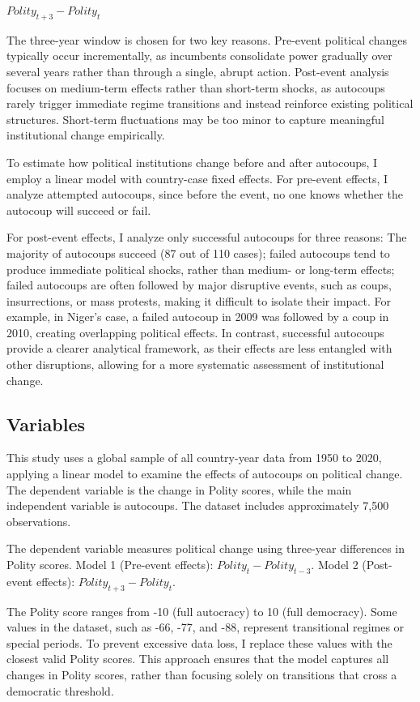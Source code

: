\documentclass[
  12pt,
]{report}
\begin{document}
\(Polity_{t+3} - Polity_t\)

The three-year window is chosen for two key reasons. Pre-event political
changes typically occur incrementally, as incumbents consolidate power
gradually over several years rather than through a single, abrupt
action. Post-event analysis focuses on medium-term effects rather than
short-term shocks, as autocoups rarely trigger immediate regime
transitions and instead reinforce existing political structures.
Short-term fluctuations may be too minor to capture meaningful
institutional change empirically.

To estimate how political institutions change before and after
autocoups, I employ a linear model with country-case fixed effects. For
pre-event effects, I analyze attempted autocoups, since before the
event, no one knows whether the autocoup will succeed or fail.

For post-event effects, I analyze only successful autocoups for three
reasons: The majority of autocoups succeed (87 out of 110 cases); failed
autocoups tend to produce immediate political shocks, rather than
medium- or long-term effects; failed autocoups are often followed by
major disruptive events, such as coups, insurrections, or mass protests,
making it difficult to isolate their impact. For example, in Niger's
case, a failed autocoup in 2009 was followed by a coup in 2010, creating
overlapping political effects. In contrast, successful autocoups provide
a clearer analytical framework, as their effects are less entangled with
other disruptions, allowing for a more systematic assessment of
institutional change.

\subsection{Variables}\label{variables}

This study uses a global sample of all country-year data from 1950 to
2020, applying a linear model to examine the effects of autocoups on
political change. The dependent variable is the change in Polity scores,
while the main independent variable is autocoups. The dataset includes
approximately 7,500 observations.

The dependent variable measures political change using three-year
differences in Polity scores. Model 1 (Pre-event effects):
\(Polity_t − Polity_{t − 3}\). Model 2 (Post-event effects):
\(Polity_{t+3} - Polity_t\).

The Polity score ranges from -10 (full autocracy) to 10 (full
democracy). Some values in the dataset, such as -66, -77, and -88,
represent transitional regimes or special periods. To prevent excessive
data loss, I replace these values with the closest valid Polity scores.
This approach ensures that the model captures all changes in Polity
scores, rather than focusing solely on transitions that cross a
democratic threshold.
\end{document}
